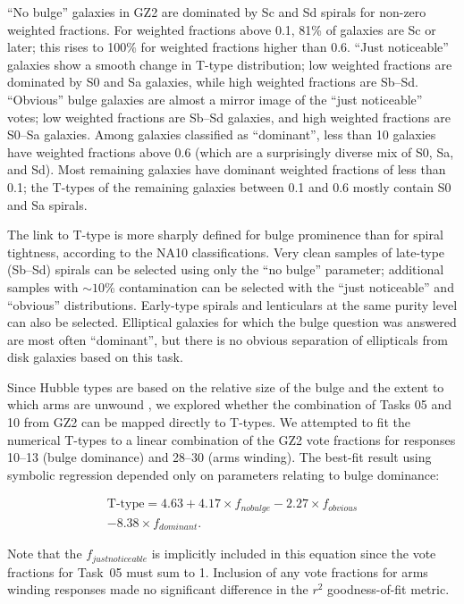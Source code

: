 \documentclass[useAMS,usenatbib]{mn2e}
\begin{document}
``No bulge'' galaxies in GZ2 are dominated by Sc and Sd spirals for non-zero weighted fractions. For weighted fractions above 0.1, 81\% of galaxies are Sc or later; this rises to 100\% for weighted fractions higher than 0.6. ``Just noticeable'' galaxies show a smooth change in T-type distribution; low weighted fractions are dominated by S0 and Sa galaxies, while high weighted fractions are Sb--Sd. ``Obvious'' bulge galaxies are almost a mirror image of the ``just noticeable'' votes; low weighted fractions are Sb--Sd galaxies, and high weighted fractions are S0--Sa galaxies. Among galaxies classified as ``dominant'', less than 10 galaxies have weighted fractions above 0.6 (which are a surprisingly diverse mix of S0, Sa, and Sd). Most remaining galaxies have dominant weighted fractions of less than 0.1; the T-types of the remaining galaxies between 0.1 and 0.6 mostly contain S0 and Sa spirals. 

The link to T-type is more sharply defined for bulge prominence than for spiral tightness, according to the NA10 classifications. Very clean samples of late-type (Sb--Sd) spirals can be selected using only the ``no bulge'' parameter; additional samples with $\sim10$\% contamination can be selected with the ``just noticeable'' and ``obvious'' distributions. Early-type spirals and lenticulars at the same purity level can also be selected. Elliptical galaxies for which the bulge question was answered are most often ``dominant'', but there is no obvious separation of ellipticals from disk galaxies based on this task. 

Since Hubble types are based on the relative size of the bulge and the extent to which arms are unwound \citep{hub26}, we explored whether the combination of Tasks 05 and 10 from GZ2 can be mapped directly to T-types. We attempted to fit the numerical T-types to a linear combination of the GZ2 vote fractions for responses 10--13 (bulge dominance) and 28--30 (arms winding). The best-fit result using symbolic regression \citep{sch09c} depended only on parameters relating to bulge dominance:

\begin{eqnarray}
\label{eqn-eureqa}
\text{T-type} = 4.63 + 4.17\times f_{no bulge} - 2.27\times f_{obvious} \\ \nonumber
- 8.38\times f_{dominant}.
\end{eqnarray}

\noindent Note that the $f_{just noticeable}$ is implicitly included in this equation since the vote fractions for Task~05 must sum to 1. Inclusion of any vote fractions for arms winding responses made no significant difference in the $r^2$ goodness-of-fit metric.
\end{document}
